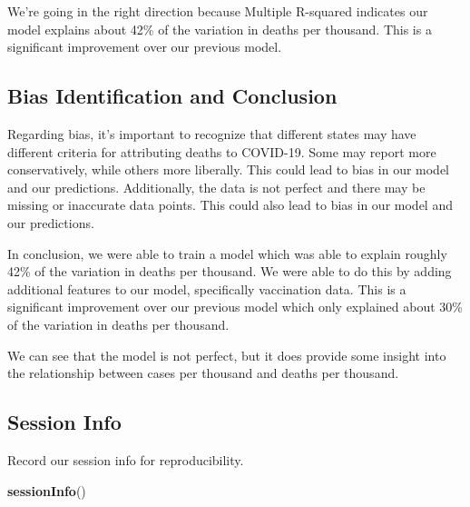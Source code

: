 \documentclass[
]{article}
\newenvironment{Shaded}{\begin{snugshade}}{\end{snugshade}}
\newcommand{\FunctionTok}[1]{\textcolor[rgb]{0.13,0.29,0.53}{\textbf{#1}}}
\newcommand{\NormalTok}[1]{#1}
\begin{document}
We're going in the right direction because Multiple R-squared indicates
our model explains about 42\% of the variation in deaths per thousand.
This is a significant improvement over our previous model.

\subsection{Bias Identification and
Conclusion}\label{bias-identification-and-conclusion}

Regarding bias, it's important to recognize that different states may
have different criteria for attributing deaths to COVID-19. Some may
report more conservatively, while others more liberally. This could lead
to bias in our model and our predictions. Additionally, the data is not
perfect and there may be missing or inaccurate data points. This could
also lead to bias in our model and our predictions.

In conclusion, we were able to train a model which was able to explain
roughly 42\% of the variation in deaths per thousand. We were able to do
this by adding additional features to our model, specifically
vaccination data. This is a significant improvement over our previous
model which only explained about 30\% of the variation in deaths per
thousand.

We can see that the model is not perfect, but it does provide some
insight into the relationship between cases per thousand and deaths per
thousand.

\subsection{Session Info}\label{session-info}

Record our session info for reproducibility.

\begin{Shaded}
\begin{Highlighting}[]
\FunctionTok{sessionInfo}\NormalTok{()}
\end{Highlighting}
\end{Shaded}
\end{document}
